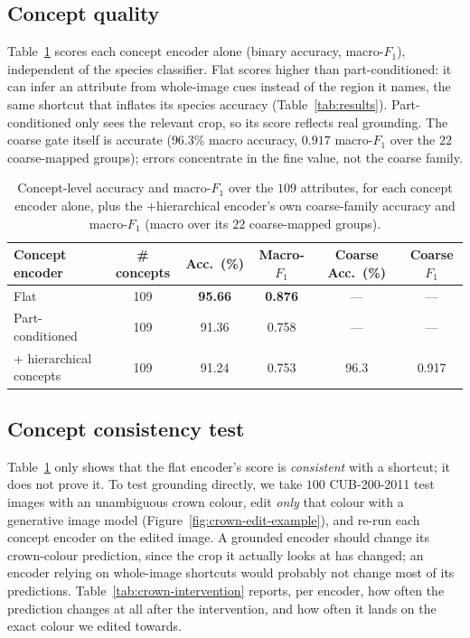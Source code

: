 \subsection{Concept quality}
\label{sec:concept-quality}
Table~\ref{tab:concepts} scores each concept encoder alone (binary accuracy,
macro-$F_1$), independent of the species classifier. Flat scores higher than
part-conditioned: it can infer an attribute from whole-image cues instead of
the region it names, the same shortcut that inflates its species accuracy
(Table~\ref{tab:results}). Part-conditioned only sees the relevant crop, so
its score reflects real grounding. The coarse gate itself is accurate
($96.3\%$ macro accuracy, $0.917$ macro-$F_1$ over the $22$ coarse-mapped
groups); errors concentrate in the fine value, not the coarse family.

\begin{table}[h]
  \centering
  \scriptsize
  \setlength{\tabcolsep}{3pt}
  \caption{Concept-level accuracy and macro-$F_1$ over the $109$ attributes,
  for each concept encoder alone, plus the $+$hierarchical encoder's own
  coarse-family accuracy and macro-$F_1$ (macro over its $22$ coarse-mapped
  groups).}
  \label{tab:concepts}
  \begin{tabular}{lccccc}
    \toprule
    Concept encoder & \# concepts & Acc.\ (\%) & Macro-$F_1$ & Coarse Acc.\ (\%) & Coarse $F_1$ \\
    \midrule
    Flat                          & 109 & \textbf{95.66} & \textbf{0.876} & --- & --- \\
    Part-conditioned              & 109 & 91.36 & 0.758 & --- & --- \\
    \; + hierarchical concepts    & 109 & 91.24 & 0.753 & 96.3 & 0.917 \\
    \bottomrule
  \end{tabular}
\end{table}

\subsection{Concept consistency test}
Table~\ref{tab:concepts} only shows that the flat encoder's score is
\emph{consistent} with a shortcut; it does not prove it. To test grounding
directly, we take $100$ CUB-200-2011 test images with an unambiguous crown
colour, edit \emph{only} that colour with a generative image model (Figure~\ref{fig:crown-edit-example}), and re-run each
concept encoder on the edited image. 
A grounded encoder should change its
crown-colour prediction, since the crop it actually looks at has changed; an
encoder relying on whole-image shortcuts would probably not change most of its predictions.
Table~\ref{tab:crown-intervention} reports, per encoder, how often the
prediction changes at all after the intervention, and how often it lands on the exact colour we
edited towards.

